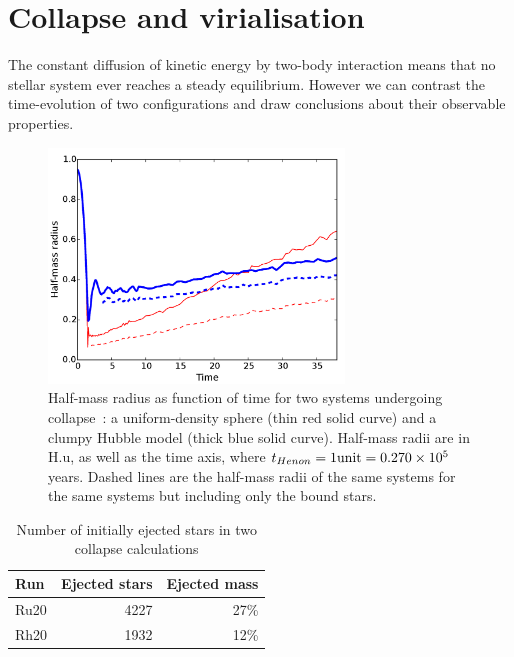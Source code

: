   
\section{Collapse and virialisation}
\label{Sec:Collapse}


The constant diffusion of kinetic energy by two-body interaction means that no stellar system ever reaches a steady equilibrium. However we can contrast the time-evolution of two configurations and draw conclusions about their observable properties. 







\begin{figure}
\begin{center}
\includegraphics[width=0.7\textwidth]{Figures/3_Rhm_global}
\caption{Half-mass radius as function of time for two systems undergoing collapse~: a uniform-density sphere (thin red solid curve) and a clumpy Hubble model (thick blue solid curve). Half-mass radii are in H.u, as well as the time axis, where $t_{Henon} = 1 {\rm unit} =  0.270 \times 10^5 $ years. Dashed lines are the half-mass radii of the same systems for the same systems but including only the bound stars.}
\label{Fig:3_Rhm_global}
\end{center}
\end{figure}

\begin{table}
\begin{center}
\caption{Number of initially ejected stars in two collapse calculations} \label{tab:Ejectedstars}
\begin{tabular}{lrr}
Run & Ejected stars & Ejected mass  \\
\hline
Ru20  &  4227 & 27\% \\
Rh20  &  1932 & 12\% \\
\hline
\end{tabular}
\end{center}
\end{table}




